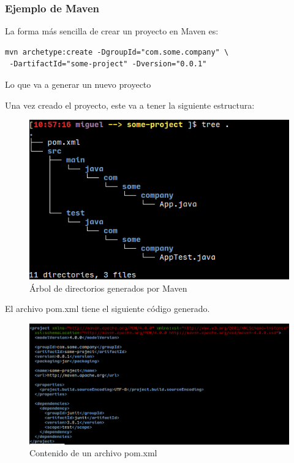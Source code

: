 \documentclass{beamer}
\begin{document}
\begin{frame}[fragile]
  \frametitle{Ejemplo de Maven}

  La forma más sencilla de crear un proyecto en Maven es:
\begin{verbatim}
mvn archetype:create -DgroupId="com.some.company" \
 -DartifactId="some-project" -Dversion="0.0.1"
\end{verbatim}

  Lo que va a generar un nuevo proyecto
\end{frame}

\begin{frame}[fragile]
  Una vez creado el proyecto, este va a tener la siguiente estructura:
  \begin{figure}[ht]
    \centering
    \includegraphics[scale=0.4]{figures/tree.png}
    \caption{\label{fig:tree} Árbol de directorios generados por Maven}
  \end{figure}

\end{frame}

\begin{frame}[fragile]
  El archivo pom.xml tiene el siguiente código generado.
  \begin{figure}[ht]
    \centering
    \includegraphics[scale=0.30]{figures/pom.png}
    \caption{\label{fig:pom} Contenido de un archivo pom.xml}
  \end{figure}

\end{frame}
\end{document}
